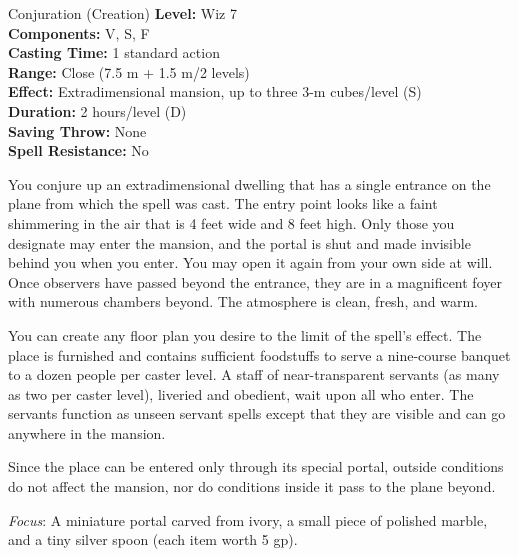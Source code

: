{Conjuration (Creation)}
{
	\textbf{Level:}
	Wiz 7\\
	\textbf{Components:}
	V, S, F\\
	\textbf{Casting Time:}
	1 standard action\\
	\textbf{Range:}
	Close (7.5 m + 1.5 m/2 levels)\\
	\textbf{Effect:}
	Extradimensional mansion, up to three 3-m cubes/level (S)\\
	\textbf{Duration:}
	2 hours/level (D)\\
	\textbf{Saving Throw:}
	None\\
	\textbf{Spell Resistance:}
	No\\
}
{
	You conjure up an extradimensional dwelling that has a single entrance on the plane from which the spell was cast. The entry point looks like a faint shimmering in the air that is 4 feet wide and 8 feet high. Only those you designate may enter the mansion, and the portal is shut and made invisible behind you when you enter. You may open it again from your own side at will. Once observers have passed beyond the entrance, they are in a magnificent foyer with numerous chambers beyond. The atmosphere is clean, fresh, and warm.

	You can create any floor plan you desire to the limit of the spell's effect. The place is furnished and contains sufficient foodstuffs to serve a nine-course banquet to a dozen people per caster level. A staff of near-transparent servants (as many as two per caster level), liveried and obedient, wait upon all who enter. The servants function as unseen servant spells except that they are visible and can go anywhere in the mansion.

	Since the place can be entered only through its special portal, outside conditions do not affect the mansion, nor do conditions inside it pass to the plane beyond.

	\textit{Focus}:
	A miniature portal carved from ivory, a small piece of polished marble, and a tiny silver spoon (each item worth 5 gp).

}
